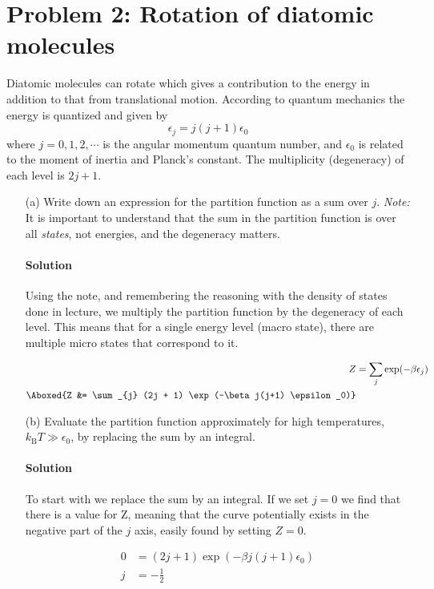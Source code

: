 \documentclass{article}
\begin{document}
	\section[Problem 2]{Problem 2: Rotation of diatomic molecules}
	Diatomic molecules can rotate which gives a contribution to the energy in addition to that from	translational motion. According to quantum mechanics the energy is quantized and given by
	\[
		\epsilon_j = j(j+1)\epsilon_0
	\]
	where $j=0,1,2,\cdots$ is the angular momentum quantum number, and $\epsilon_0$ is related to the moment of inertia and Planck's constant. The multiplicity (degeneracy) of each level is $2j+1$.
	\begin{enumerate}
		\item[(a)] Write down an expression for the partition function as a sum over $j$. \textit{Note:} It is important to understand that the sum in the partition function is over all \textit{states}, not energies, and the degeneracy matters.
		\paragraph{Solution} Using the note, and remembering the reasoning with the density of states done in lecture, we multiply the partition function by the degeneracy of each level. This means that for a single energy level (macro state), there are multiple micro states that correspond to it.
		
		\begin{equation}
			\begin{split}
				Z &= \sum_{j} \exp(-\beta\epsilon_j) \\
				\Aboxed{Z &= \sum_{j} (2j + 1) \exp(-\beta j(j+1) \epsilon_0)} \\
			\end{split}
		\end{equation}
		
		\item[(b)] Evaluate the partition function approximately for high temperatures, $k_\mathrm{B}T \gg \epsilon_0$, by replacing the sum by an integral.
		\paragraph{Solution} To start with we replace the sum by an integral. If we set $j=0$ we find that there is a value for Z, meaning that the curve potentially exists in the negative part of the $j$ axis, easily found by setting $Z=0$.
		
		\begin{equation}
			\begin{split}
				0 &= (2j + 1) \exp(-\beta j(j+1) \epsilon_0) \\
				j &= -\frac{1}{2}
			\end{split}
		\end{equation}
				

\end{enumerate}
\end{document}
